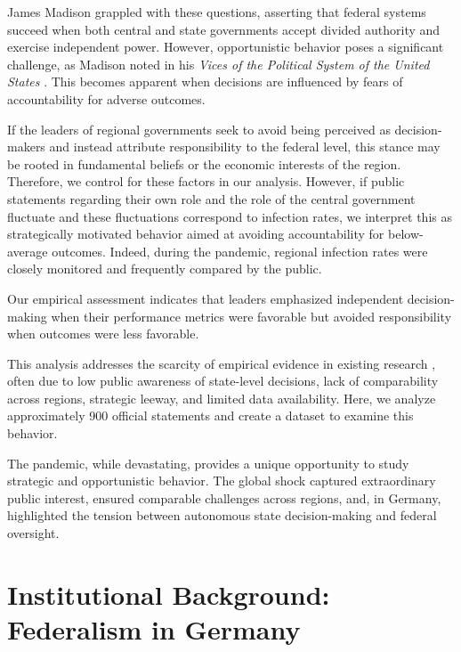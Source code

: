 \documentclass[authoryear,12pt, 3p]{elsarticle} %
\theoremstyle{break}
\begin{document}
James Madison grappled with these questions, asserting that federal systems succeed when both central and state governments accept divided authority and exercise independent power. However, opportunistic behavior poses a significant challenge, as Madison noted in his \textit{Vices of the Political System of the United States} \citep{Madison1787}. This becomes apparent when decisions are influenced by fears of accountability for adverse outcomes.

If the leaders of regional governments seek to avoid being perceived as decision-makers and instead attribute responsibility to the federal level, this stance may be rooted in fundamental beliefs or the economic interests of the region. Therefore, we control for these factors in our analysis. However, if public statements regarding their own role and the role of the central government fluctuate and these fluctuations correspond to infection rates, we interpret this as strategically motivated behavior aimed at avoiding accountability for below-average outcomes. Indeed, during the pandemic, regional infection rates were closely monitored and frequently compared by the public. 

Our empirical assessment indicates that leaders emphasized independent decision-making when their performance metrics were favorable but avoided responsibility when outcomes were less favorable.

This analysis addresses the scarcity of empirical evidence in existing research \citep{Agrawal2022}, often due to low public awareness of state-level decisions, lack of comparability across regions, strategic leeway, and limited data availability. Here, we analyze approximately 900 official statements and create a dataset to examine this behavior.

The pandemic, while devastating, provides a unique opportunity to study strategic and opportunistic behavior. The global shock captured extraordinary public interest, ensured comparable challenges across regions, and, in Germany, highlighted the tension between autonomous state decision-making and federal oversight.

\section[Federalism in Germany]{Institutional Background: Federalism in Germany}\label{FederalisminGermany}
%
\end{document}
